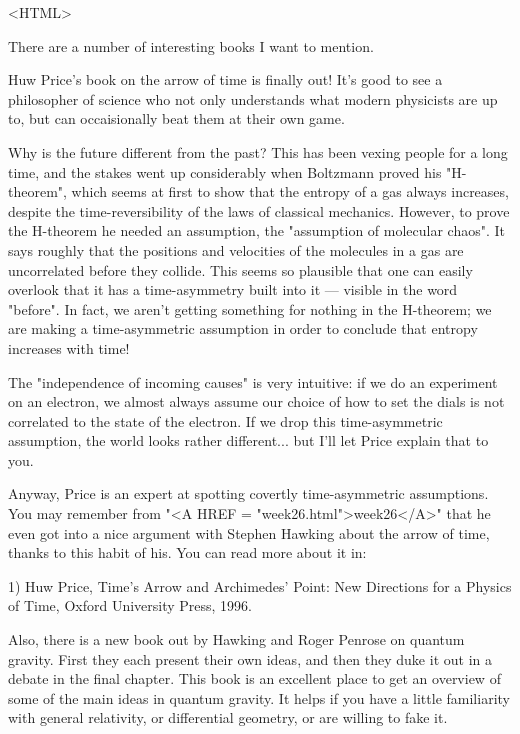 <HTML>



There are a number of interesting books I want to mention.

Huw Price's book on the arrow of time is finally out!  It's good to see
a philosopher of science who not only understands what modern physicists
are up to, but can occaisionally beat them at their own game.  

Why is the future different from the past?  This has been vexing people
for a long time, and the stakes went up considerably when Boltzmann
proved his "H-theorem", which seems at first to show that the entropy of
a gas always increases, despite the time-reversibility of the laws of
classical mechanics.  However, to prove the H-theorem he needed an
assumption, the "assumption of molecular chaos".  It says roughly that
the positions and velocities of the molecules in a gas are uncorrelated
before they collide.  This seems so plausible that one can easily 
overlook that it has a time-asymmetry built into it --- visible in the
word "before".  In fact, we aren't getting something for nothing in the
H-theorem; we are making a time-asymmetric assumption in order to
conclude that entropy increases with time!

The "independence of incoming causes" is very intuitive: if we do an
experiment on an electron, we almost always assume our choice of how to
set the dials is not correlated to the state of the electron.  If we
drop this time-asymmetric assumption, the world looks rather
different... but I'll let Price explain that to you.

Anyway, Price is an expert at spotting covertly time-asymmetric
assumptions.  You may remember from "<A HREF = "week26.html">week26</A>" that he even got into a
nice argument with Stephen Hawking about the arrow of time, thanks to
this habit of his.  You can read more about it in:

1) Huw Price, Time's Arrow and Archimedes' Point: New Directions for a
Physics of Time, Oxford University Press, 1996.  

Also, there is a new book out by Hawking and Roger Penrose on quantum
gravity.  First they each present their own ideas, and then they duke it
out in a debate in the final chapter.  This book is an excellent place
to get an overview of some of the main ideas in quantum gravity.  It
helps if you have a little familiarity with general relativity, or
differential geometry, or are willing to fake it.  

